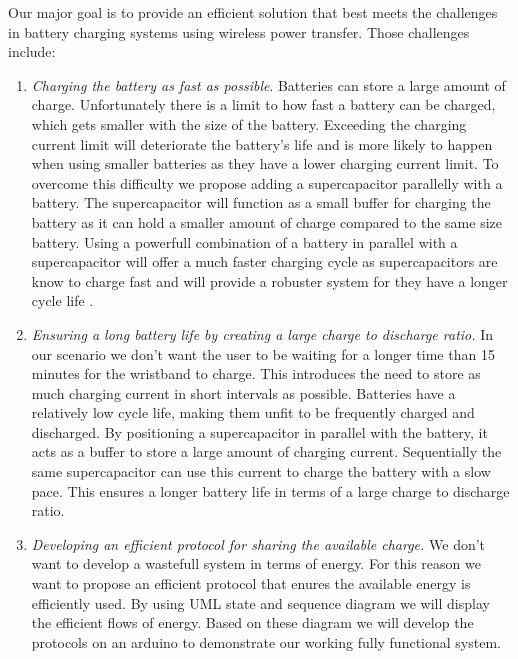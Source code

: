 %
%
Our major goal is to provide an efficient solution that best meets the challenges in battery charging systems using wireless power transfer.
Those challenges include:
\begin{enumerate}
\item \emph{Charging the battery as fast as possible}.
Batteries can store a large amount of charge. Unfortunately there is a limit to how fast a battery can be charged, which gets smaller with the size of the battery. Exceeding the charging current limit will deteriorate the battery's life and is more likely to happen when using smaller batteries as they have a lower charging current limit. To overcome this difficulty we propose adding a supercapacitor parallelly with a battery. The supercapacitor will function as a small buffer for charging the battery as it can hold a smaller amount of charge compared to the same size battery. Using a powerfull combination of a battery in parallel with a supercapacitor will offer a much faster charging cycle as supercapacitors are know to charge fast and will provide a robuster system for they have a longer cycle life \cite{IAmp}.

\item \emph{Ensuring a long battery life by creating a large charge to discharge ratio.}
In our scenario we don't want the user to be waiting for a longer time than 15 minutes for the wristband to charge. This introduces the need to store as much charging current in short intervals as possible. Batteries have a relatively low cycle life, making them unfit to be frequently charged and discharged. By positioning a supercapacitor in parallel with the battery, it acts as a buffer to store a large amount of charging current. Sequentially the same supercapacitor can use this current to charge the battery with a slow pace. This ensures a longer battery life in terms of a large charge to discharge ratio. 

\item \emph{Developing an efficient protocol for sharing the available charge.}
We don't want to develop a wastefull system in terms of energy. For this reason we want to propose an efficient protocol that enures the available energy is efficiently used. By using UML state and sequence diagram we will display the efficient flows of energy. Based on these diagram we will develop the protocols on an arduino to demonstrate our working fully functional system.
\end{enumerate}

